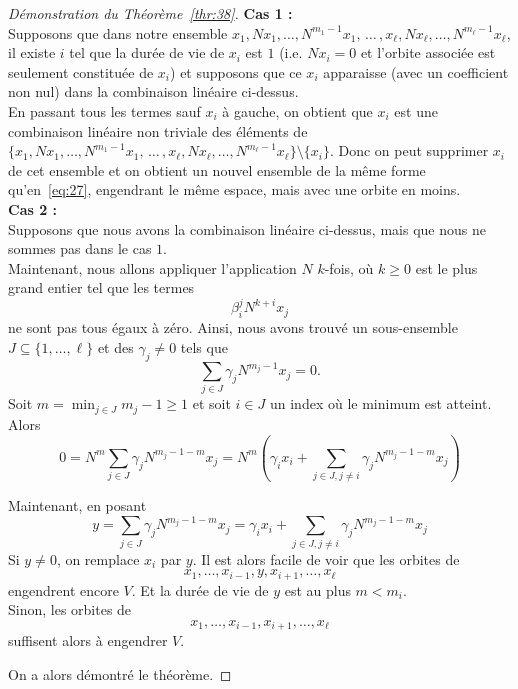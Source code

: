 \begin{proof}[Démonstration du Théorème~\ref{thr:38}]
\textbf{Cas 1 :} \\
Supposons que dans notre ensemble $x_1,Nx_1,\dots,N^{m_1-1}x_1, \,\dots \, ,  x_\ell,Nx_\ell,\dots,N^{m_\ell-1}x_\ell$, il existe $i$ tel que la durée de vie de $x_i$ est $1$ (i.e. $Nx_i = 0$ et l'orbite associée est seulement constituée de $x_i$) et supposons que ce $x_i$ apparaisse (avec un coefficient non nul) dans la combinaison linéaire ci-dessus. \\
En passant tous les termes sauf $x_i$ à gauche, on obtient  que $x_i$ est une combinaison linéaire non triviale des éléments de $\{ x_1,Nx_1,\dots,N^{m_1-1}x_1, \,\dots \, ,  x_\ell,Nx_\ell,\dots,N^{m_\ell-1}x_\ell \} \setminus \{x_i\}$. Donc on peut supprimer $x_i$ de cet ensemble et on obtient un nouvel ensemble de la même forme qu'en~\eqref{eq:27}, engendrant le même espace, mais avec une orbite en moins. \\

\textbf{Cas 2 :} \\
Supposons que nous avons la combinaison linéaire ci-dessus, mais que nous ne sommes pas dans le cas $1$. \\
Maintenant, nous allons appliquer l'application $N$ $k$-fois, où $k \geq 0$ est le plus grand entier tel que les termes 
\begin{displaymath}
  β_i^j N^{k+i}x_j 
\end{displaymath}
ne sont pas tous égaux à zéro. Ainsi, nous avons trouvé un sous-ensemble $J ⊆ \{1,\dots,\ell \}$ et des $γ_j ≠ 0$ tels que 
\begin{displaymath}
  \sum_{j \in J} γ_j N^{m_j-1}x_j = 0.
\end{displaymath}
Soit $m = \min_{j \in J} {m_j-1} \geq 1$ et soit $i \in J$ un index où le minimum est atteint. Alors 
\begin{displaymath}
 0 =  N^m  \sum_{j \in J} γ_j N^{m_j-1 - m}x_j  = N^m \left( γ_i x_i + \sum_{j \in J, j \neq i} γ_j N^{m_j-1 - m}x_j \right)
\end{displaymath}

Maintenant, en posant $$y = \sum_{j \in J} γ_j N^{m_j-1 - m}x_j = γ_i x_i + \sum_{j \in J, j \neq i} γ_j N^{m_j-1 - m}x_j$$ 
Si $y \neq 0$, on remplace $x_i$ par $y$.
Il est alors facile de voir que les orbites de 
\begin{displaymath}
  x_1,\dots, x_{i-1},y,x_{i+1},\dots,x_\ell
\end{displaymath}
engendrent encore $V$. Et la durée de vie de $y$ est au plus $m<m_i$. \\
Sinon, les orbites de
\begin{displaymath}
  x_1,\dots, x_{i-1},x_{i+1},\dots,x_\ell
\end{displaymath}
suffisent alors à engendrer $V$.

On a alors démontré le théorème.  
\end{proof}



